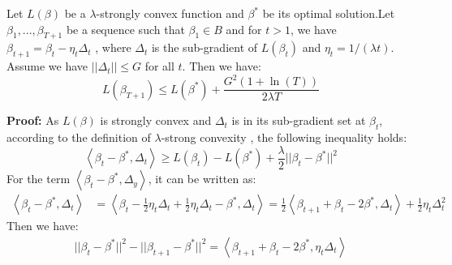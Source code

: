 \begin{theorem}\label{th:1}
Let $L(\beta)$ be a $\lambda$-strongly convex function and $\beta^*$ be its optimal solution.Let $\beta_1,...,\beta_{T+1}$ be a sequence such that $\beta_1 \in B$ and for $t>1$, we have $\beta_{t+1} = \beta_t - \eta_t \Delta_t$ , where $\Delta_t$ is the sub-gradient of $L(\beta_t)$ and $\eta_t = 1/(\lambda t)$. Assume we have $||\Delta_t|| \leq G$ for all $t$. Then we have:	
	\begin{equation}
	L(\beta_{T+1}) \leq L(\beta^*)+\frac{G^2(1+\ln (T))}{2\lambda T}
	\end{equation}
\end{theorem}
\textbf{Proof:}
	As $L(\beta)$ is strongly convex and $\Delta_t$ is in its sub-gradient set at $\beta_t$, according to the definition of $\lambda$-strong convexity \cite{rockafellar2015convex}, the following inequality holds:	
	\begin{equation}\label{eq:app:strong}
		\left\langle {\beta_t - \beta^*,\Delta_t} \right\rangle \geq L(\beta_t)-L(\beta^*)+\frac{\lambda}{2}||\beta_t - \beta^*||^2
	\end{equation} 
	For the term $\left\langle {\beta_t - \beta^*,\Delta_y} \right\rangle$, it can be written as:	
	\begin{equation} \label{eq:app:inner}
	\begin{aligned}
	\left\langle {\beta_t - \beta^*,\Delta_t} \right\rangle &= \left\langle {\beta_t - \frac{1}{2}\eta_t\Delta_t + \frac{1}{2}\eta_t\Delta_t- \beta^*,\Delta_t} \right\rangle
	=\frac{1}{2}\left\langle {{\beta _{t + 1}} + {\beta _t} - 2{\beta ^*},{\Delta _t}} \right\rangle  + \frac{1}{2}{\eta _t}\Delta _t^2
	\end{aligned}
	\end{equation}	
	Then we have:
	\begin{equation}\label{eq:app:squrediff}
	\begin{aligned}
	||\beta_t-\beta^*||^2-||\beta_{t+1}-\beta^*||^2 
	=\left\langle {{\beta _{t + 1}} + {\beta _t} - 2{\beta ^*},{\eta_t\Delta _t}} \right\rangle
	\end{aligned}
	\end{equation}
